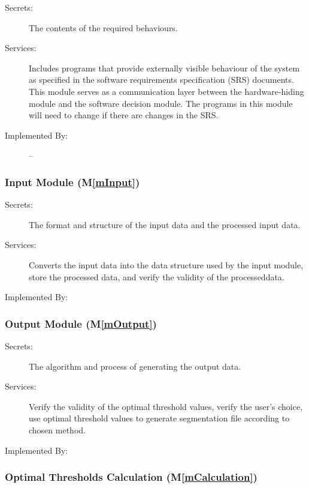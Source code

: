 \documentclass[12pt, titlepage]{article}
\newcommand{\mref}[1]{M\ref{#1}}
\begin{document}
\begin{description}
\item[Secrets:]The contents of the required behaviours.
\item[Services:]Includes programs that provide externally visible behaviour of
  the system as specified in the software requirements specification (SRS)
  documents. This module serves as a communication layer between the
  hardware-hiding module and the software decision module. The programs in this
  module will need to change if there are changes in the SRS.
\item[Implemented By:] --
\end{description}

\subsubsection{Input Module (\mref{mInput})}

\begin{description}
\item[Secrets:]The format and structure of the input data and the processed
input data.
\item[Services:]Converts the input data into the data structure used by the
input module, store the processed data, and verify the validity of the processeddata.
\item[Implemented By:] \progname{}
\end{description}

\subsubsection{Output Module (\mref{mOutput})}

\begin{description}
\item[Secrets:]The algorithm and process of generating the output data.
\item[Services:]Verify the validity of the optimal threshold values, verify the
user's choice, use optimal threshold values to generate segmentation file
according to chosen method.
\item[Implemented By:] \progname{}
\end{description}

\subsubsection{Optimal Thresholds Calculation (\mref{mCalculation})}
\end{document}
